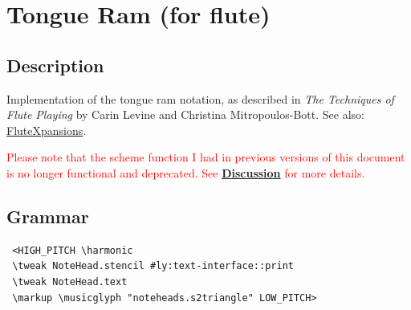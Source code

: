 

\section {Tongue Ram (for flute)}
\hfill
\subsection{Description}
Implementation of the tongue ram notation, as described in \textit{The Techniques of Flute Playing} by Carin Levine and Christina Mitropoulos-Bott.\autocite[28]{RN1695} See also: \href{https://www.flutexpansions.com/tongue-ram}{FluteXpansions}.\par
\textcolor{red}{Please note that the scheme function I had in previous versions of this document is no longer functional and deprecated. See \hyperref[sec:tongue_ram_discussion]{\textbf{Discussion}} for more details.}

\subsection{Grammar}
\begin{verbatim}
 <HIGH_PITCH \harmonic
 \tweak NoteHead.stencil #ly:text-interface::print
 \tweak NoteHead.text
 \markup \musicglyph "noteheads.s2triangle" LOW_PITCH>
\end{verbatim}



